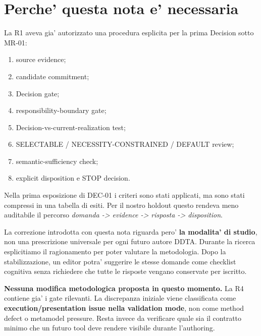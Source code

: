 \documentclass[11pt,a4paper]{article}
\begin{document}
\section{Perche' questa nota e' necessaria}

La R1 aveva gia' autorizzato una procedura esplicita per la prima Decision sotto MR-01:
\begin{enumerate}
  \item source evidence;
  \item candidate commitment;
  \item Decision gate;
  \item responsibility-boundary gate;
  \item Decision-vs-current-realization test;
  \item SELECTABLE / NECESSITY-CONSTRAINED / DEFAULT review;
  \item semantic-sufficiency check;
  \item explicit disposition e STOP decision.
\end{enumerate}

Nella prima esposizione di DEC-01 i criteri sono stati applicati, ma sono stati compressi in una tabella di esiti. Per il nostro holdout questo rendeva meno auditabile il percorso \emph{domanda -> evidence -> risposta -> disposition}.

La correzione introdotta con questa nota riguarda pero' \textbf{la modalita' di studio}, non una prescrizione universale per ogni futuro autore DDTA. Durante la ricerca esplicitiamo il ragionamento per poter valutare la metodologia. Dopo la stabilizzazione, un editor potra' suggerire le stesse domande come checklist cognitiva senza richiedere che tutte le risposte vengano conservate per iscritto.

\begin{ddtacore}[title={Classificazione della discrepanza}]
\textbf{Nessuna modifica metodologica proposta in questo momento.}
La R4 contiene gia' i gate rilevanti. La discrepanza iniziale viene classificata come \textbf{execution/presentation issue nella validation mode}, non come method defect o metamodel pressure. Resta invece da verificare quale sia il contratto minimo che un futuro tool deve rendere visibile durante l'authoring.
\end{ddtacore}
\end{document}
